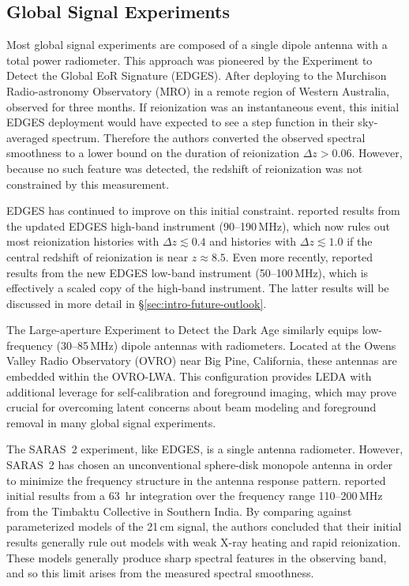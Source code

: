 \begin{bibunit}
\subsection{Global Signal Experiments}

Most global signal experiments are composed of a single dipole antenna with a total power
radiometer. This approach was pioneered by the Experiment to Detect the Global EoR Signature
(EDGES). After deploying to the Murchison Radio-astronomy Observatory (MRO) in a remote region of
Western Australia, \citet{2010Natur.468..796B} observed for three months. If reionization was an
instantaneous event, this initial EDGES deployment would have expected to see a step function in
their sky-averaged spectrum. Therefore the authors converted the observed spectral smoothness to a
lower bound on the duration of reionization $\Delta z > 0.06$. However, because no such feature was
detected, the redshift of reionization was not constrained by this measurement.

EDGES has continued to improve on this initial constraint.  \citet{2017ApJ...847...64M} reported
results from the updated EDGES high-band instrument (90--190\,MHz), which now rules out most
reionization histories with $\Delta z \lesssim 0.4$ and histories with $\Delta z \lesssim 1.0$ if
the central redshift of reionization is near $z\approx 8.5$. Even more recently,
\citet{2018Natur.555...67B} reported results from the new EDGES low-band instrument (50--100\,MHz),
which is effectively a scaled copy of the high-band instrument. The latter results will be discussed
in more detail in \S\ref{sec:intro-future-outlook}.

The Large-aperture Experiment to Detect the Dark Age \citep[LEDA;][]{2018MNRAS.478.4193P} similarly
equips low-frequency (30--85\,MHz) dipole antennas with radiometers. Located at the Owens Valley
Radio Observatory (OVRO) near Big Pine, California, these antennas are embedded within the OVRO-LWA.
This configuration provides LEDA with additional leverage for self-calibration and foreground
imaging, which may prove crucial for overcoming latent concerns about beam modeling and foreground
removal in many global signal experiments.

The SARAS~2 experiment, like EDGES, is a single antenna radiometer. However, SARAS~2 has chosen an
unconventional sphere-disk monopole antenna in order to minimize the frequency structure in the
antenna response pattern. \citet{2017ApJ...845L..12S} reported initial results from a 63~hr
integration over the frequency range 110--200\,MHz from the Timbaktu Collective in Southern India.
By comparing against parameterized models of the 21\,cm signal, the authors concluded that their
initial results generally rule out models with weak X-ray heating and rapid reionization. These
models generally produce sharp spectral features in the observing band, and so this limit arises
from the measured spectral smoothness.


\end{bibunit}
